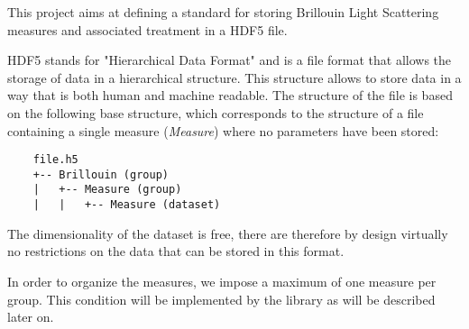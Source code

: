 This project aims at defining a standard for storing Brillouin Light Scattering measures and associated treatment in a HDF5 file.

HDF5 stands for "Hierarchical Data Format" and is a file format that allows the storage of data in a hierarchical structure. This structure allows to store data in a way that is both human and machine readable. The structure of the file is based on the following base structure, which corresponds to the structure of a file containing a single measure (\textit{Measure}) where no parameters have been stored:

\begin{verbatim}
    file.h5
    +-- Brillouin (group)
    |   +-- Measure (group)
    |   |   +-- Measure (dataset)
\end{verbatim}

The dimensionality of the dataset is free, there are therefore by design virtually no restrictions on the data that can be stored in this format.

In order to organize the measures, we impose a maximum of one measure per group. This condition will be implemented by the library as will be described later on.